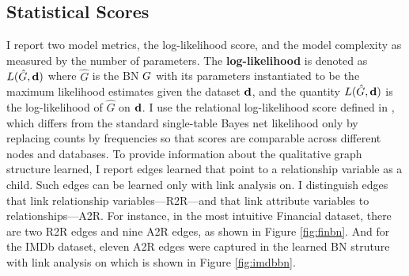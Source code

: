 \documentclass{sfuthesis}
\begin{document}
\begin{table}[!h] \centering
\caption{Model Structure Learning Time  in seconds.  %
 \label{table:runtimes}}

\end{table}



\subsection{Statistical Scores}
I  report two model metrics, the log-likelihood score, and the model complexity as measured by the number of parameters. The \textbf{log-likelihood} is denoted as $L(\hat{G},\mathbf{d})$ where $\hat{G}$ is the BN $G$ with its parameters instantiated to be the maximum likelihood estimates given the dataset $\mathbf{d}$, and the quantity $L(\hat{G},\mathbf{d})$ is the log-likelihood of $\hat{G}$ on $\mathbf{d}$. 
I  use the relational log-likelihood score defined in \cite{Schulte2011}, which differs from the standard single-table Bayes net  likelihood only by replacing counts by frequencies  so that scores are comparable across different nodes and databases. To provide information about the qualitative graph structure learned, I  report edges learned that point to a relationship variable as a child. Such edges can be learned only with link analysis on. I  distinguish edges that link relationship variables---R2R---and that link attribute variables to relationships---A2R. For instance, in the most intuitive Financial dataset, there are two R2R edges and nine A2R edges, as shown in Figure \ref{fig:finbn}.
And for the IMDb dataset, eleven A2R edges were captured in the learned BN struture with link analysis on which is shown in Figure \ref{fig:imdbbn}.
\end{document}
